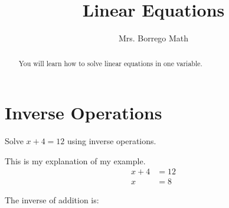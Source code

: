 \documentclass{ximera}
\title{Linear Equations}
\author{Mrs. Borrego Math}
\begin{document}
\begin{abstract}
    You will learn how to solve linear equations in one variable.
\end{abstract}
\maketitle

\section{Inverse Operations}

\begin{example}
Solve $x+4=12$ using inverse operations.
\begin{explanation}
This is my explanation of my example.
\begin{align*}
    x+4 &=12\\
    x&=8 
\end{align*}
\end{explanation}
\end{example}

\begin{problem}
The inverse of addition is: 
\begin{multipleChoice}
\end{multipleChoice}
\end{problem}
\end{document}

